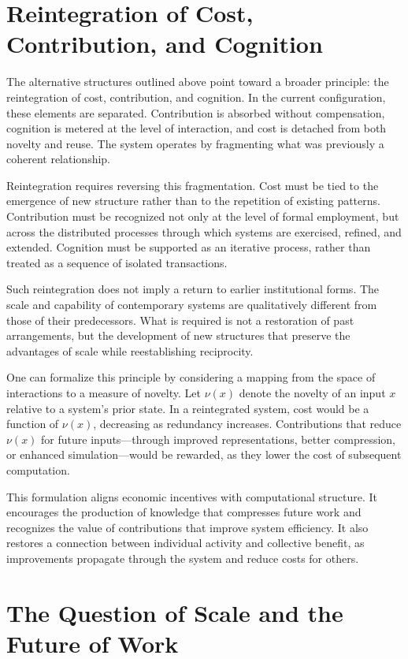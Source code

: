 \documentclass[12pt, oneside]{article}
\begin{document}
\section{Reintegration of Cost, Contribution, and Cognition}

The alternative structures outlined above point toward a broader principle: the reintegration of cost, contribution, and cognition. In the current configuration, these elements are separated. Contribution is absorbed without compensation, cognition is metered at the level of interaction, and cost is detached from both novelty and reuse. The system operates by fragmenting what was previously a coherent relationship.

Reintegration requires reversing this fragmentation. Cost must be tied to the emergence of new structure rather than to the repetition of existing patterns. Contribution must be recognized not only at the level of formal employment, but across the distributed processes through which systems are exercised, refined, and extended. Cognition must be supported as an iterative process, rather than treated as a sequence of isolated transactions.

Such reintegration does not imply a return to earlier institutional forms. The scale and capability of contemporary systems are qualitatively different from those of their predecessors. What is required is not a restoration of past arrangements, but the development of new structures that preserve the advantages of scale while reestablishing reciprocity.

One can formalize this principle by considering a mapping from the space of interactions to a measure of novelty. Let $\nu(x)$ denote the novelty of an input $x$ relative to a system’s prior state. In a reintegrated system, cost would be a function of $\nu(x)$, decreasing as redundancy increases. Contributions that reduce $\nu(x)$ for future inputs—through improved representations, better compression, or enhanced simulation—would be rewarded, as they lower the cost of subsequent computation.

This formulation aligns economic incentives with computational structure. It encourages the production of knowledge that compresses future work and recognizes the value of contributions that improve system efficiency. It also restores a connection between individual activity and collective benefit, as improvements propagate through the system and reduce costs for others.

\section{The Question of Scale and the Future of Work}
\end{document}
